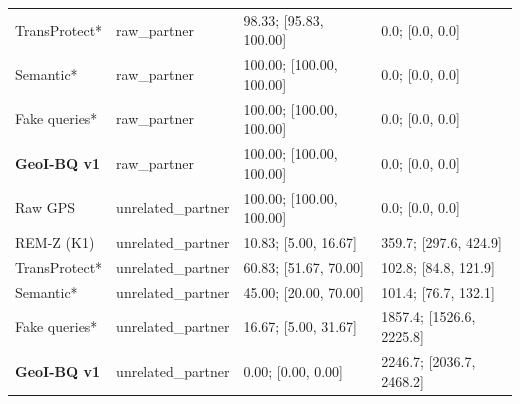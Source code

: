 \begin{longtable}{@{}P{2.5cm}P{2.6cm}P{3.7cm}P{4.3cm}@{}}
TransProtect* & raw\_\allowbreak{}partner & 98.33; [95.83, 100.00] & 0.0; [0.0, 0.0] \\
Semantic* & raw\_\allowbreak{}partner & 100.00; [100.00, 100.00] & 0.0; [0.0, 0.0] \\
Fake queries* & raw\_\allowbreak{}partner & 100.00; [100.00, 100.00] & 0.0; [0.0, 0.0] \\
\textbf{GeoI-BQ v1} & raw\_\allowbreak{}partner & 100.00; [100.00, 100.00] & 0.0; [0.0, 0.0] \\
Raw GPS & unrelated\_\allowbreak{}partner & 100.00; [100.00, 100.00] & 0.0; [0.0, 0.0] \\
REM-Z (K1) & unrelated\_\allowbreak{}partner & 10.83; [5.00, 16.67] & 359.7; [297.6, 424.9] \\
TransProtect* & unrelated\_\allowbreak{}partner & 60.83; [51.67, 70.00] & 102.8; [84.8, 121.9] \\
Semantic* & unrelated\_\allowbreak{}partner & 45.00; [20.00, 70.00] & 101.4; [76.7, 132.1] \\
Fake queries* & unrelated\_\allowbreak{}partner & 16.67; [5.00, 31.67] & 1857.4; [1526.6, 2225.8] \\
\textbf{GeoI-BQ v1} & unrelated\_\allowbreak{}partner & 0.00; [0.00, 0.00] & 2246.7; [2036.7, 2468.2] \\
\end{longtable}

\endgroup

